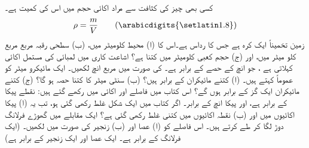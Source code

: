 کسی بھی چیز کی کثافت   سے مراد اکائی حجم میں اس کی کمیت ہے۔ 
\begin{align*}
\rho=\frac{m}{V} \tag{\arabicdigits{\setlatin1.8}}
\end{align*}
زمین تخمیناً ایک کرہ  ہے جس کا رداس    ہے۔اس کا   (ا)  محیط کلومیٹر میں،  (ب)  سطحی رقبہ مربع   مربع کلو میٹر میں،  اور  (ج) حجم  کعبی کلومیٹر  میں کتنا ہے؟ 
اشاعت کاری میں لمبائی کی مستمل اکائی کہلاتی  ہے  ،  جو  انچ کے    حصے کے برابر  ہے۔ کی صورت میں  مربع انچ  لکھیں۔ 
ایک مائیکرو میٹر    کو عموماً  کہتے ہیں۔  (ا) کتنے مائیکران    کے برابر ہیں؟ (ب) سنٹی میٹر کا کتنا حصہ   ہو گا؟  (ج) کتنے مائیکران ایک گز کے برابر ہوں گے؟
اس کتاب میں فاصلے  اور  اکائی میں رکھے گئے ہیں:  نقطے  پیکا کے برابر ہے، اور   پیکا     انچ کے برابر۔  اگر کتاب میں ایک
 شکل    غلط رکھی گئی ہو، تب یہ  (ا) پیکا اکائیوں میں اور  (ب) نقطہ اکائیوں میں کتنی غلط رکھی گئی ہے؟ 
ایک مقابلے میں گھوڑے   فرلانگ  دوڑ لگا کر طے کرتے ہیں۔ اس فاصلے کو  (ا) عصا  اور  (ب) زنجیر  کی صورت میں لکھیں۔ (ایک فرلانگ  کے برابر ہے۔ ایک عصا  اور ایک زنجیر  کے برابر ہے)
